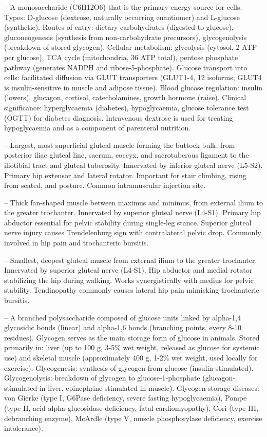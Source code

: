 -- A monosaccharide (C6H12O6) that is the primary energy source for cells. Types: D-glucose (dextrose, naturally occurring enantiomer) and L-glucose (synthetic). Routes of entry: dietary carbohydrates (digested to glucose), gluconeogenesis (synthesis from non-carbohydrate precursors), glycogenolysis (breakdown of stored glycogen). Cellular metabolism: glycolysis (cytosol, 2 ATP per glucose), TCA cycle (mitochondria, 36 ATP total), pentose phosphate pathway (generates NADPH and ribose-5-phosphate). Glucose transport into cells: facilitated diffusion via GLUT transporters (GLUT1-4, 12 isoforms; GLUT4 is insulin-sensitive in muscle and adipose tissue). Blood glucose regulation: insulin (lowers), glucagon, cortisol, catecholamines, growth hormone (raise). Clinical significance: hyperglycaemia (diabetes), hypoglycaemia, glucose tolerance test (OGTT) for diabetes diagnosis. Intravenous dextrose is used for treating hypoglycaemia and as a component of parenteral nutrition.

-- Largest, most superficial gluteal muscle forming the buttock bulk, from posterior iliac gluteal line, sacrum, coccyx, and sacrotuberous ligament to the iliotibial tract and gluteal tuberosity. Innervated by inferior gluteal nerve (L5-S2). Primary hip extensor and lateral rotator. Important for stair climbing, rising from seated, and posture. Common intramuscular injection site.

-- Thick fan-shaped muscle between maximus and minimus, from external ilium to the greater trochanter. Innervated by superior gluteal nerve (L4-S1). Primary hip abductor essential for pelvic stability during single-leg stance. Superior gluteal nerve injury causes Trendelenburg sign with contralateral pelvic drop. Commonly involved in hip pain and trochanteric bursitis.

-- Smallest, deepest gluteal muscle from external ilium to the greater trochanter. Innervated by superior gluteal nerve (L4-S1). Hip abductor and medial rotator stabilizing the hip during walking. Works synergistically with medius for pelvic stability. Tendinopathy commonly causes lateral hip pain mimicking trochanteric bursitis.

-- A branched polysaccharide composed of glucose units linked by alpha-1,4 glycosidic bonds (linear) and alpha-1,6 bonds (branching points, every 8-10 residues). Glycogen serves as the main storage form of glucose in animals. Stored primarily in: liver (up to 100 g, 3-5\% wet weight, released as glucose for systemic use) and skeletal muscle (approximately 400 g, 1-2\% wet weight, used locally for exercise). Glycogenesis: synthesis of glycogen from glucose (insulin-stimulated). Glycogenolysis: breakdown of glycogen to glucose-1-phosphate (glucagon-stimulated in liver, epinephrine-stimulated in muscle). Glycogen storage diseases: von Gierke (type I, G6Pase deficiency, severe fasting hypoglycaemia), Pompe (type II, acid alpha-glucosidase deficiency, fatal cardiomyopathy), Cori (type III, debranching enzyme), McArdle (type V, muscle phosphorylase deficiency, exercise intolerance).

